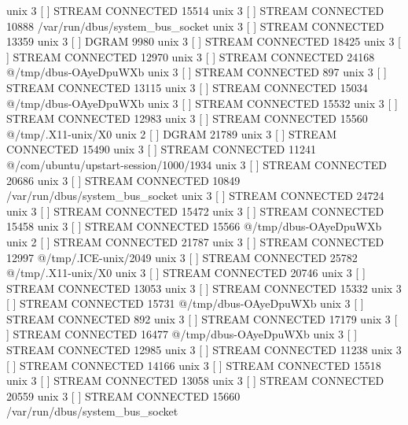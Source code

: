 unix  3      [ ]         STREAM     CONNECTED     15514    
unix  3      [ ]         STREAM     CONNECTED     10888    /var/run/dbus/system_bus_socket
unix  3      [ ]         STREAM     CONNECTED     13359    
unix  3      [ ]         DGRAM                    9980     
unix  3      [ ]         STREAM     CONNECTED     18425    
unix  3      [ ]         STREAM     CONNECTED     12970    
unix  3      [ ]         STREAM     CONNECTED     24168    @/tmp/dbus-OAyeDpuWXb
unix  3      [ ]         STREAM     CONNECTED     897      
unix  3      [ ]         STREAM     CONNECTED     13115    
unix  3      [ ]         STREAM     CONNECTED     15034    @/tmp/dbus-OAyeDpuWXb
unix  3      [ ]         STREAM     CONNECTED     15532    
unix  3      [ ]         STREAM     CONNECTED     12983    
unix  3      [ ]         STREAM     CONNECTED     15560    @/tmp/.X11-unix/X0
unix  2      [ ]         DGRAM                    21789    
unix  3      [ ]         STREAM     CONNECTED     15490    
unix  3      [ ]         STREAM     CONNECTED     11241    @/com/ubuntu/upstart-session/1000/1934
unix  3      [ ]         STREAM     CONNECTED     20686    
unix  3      [ ]         STREAM     CONNECTED     10849    /var/run/dbus/system_bus_socket
unix  3      [ ]         STREAM     CONNECTED     24724    
unix  3      [ ]         STREAM     CONNECTED     15472    
unix  3      [ ]         STREAM     CONNECTED     15458    
unix  3      [ ]         STREAM     CONNECTED     15566    @/tmp/dbus-OAyeDpuWXb
unix  2      [ ]         STREAM     CONNECTED     21787    
unix  3      [ ]         STREAM     CONNECTED     12997    @/tmp/.ICE-unix/2049
unix  3      [ ]         STREAM     CONNECTED     25782    @/tmp/.X11-unix/X0
unix  3      [ ]         STREAM     CONNECTED     20746    
unix  3      [ ]         STREAM     CONNECTED     13053    
unix  3      [ ]         STREAM     CONNECTED     15332    
unix  3      [ ]         STREAM     CONNECTED     15731    @/tmp/dbus-OAyeDpuWXb
unix  3      [ ]         STREAM     CONNECTED     892      
unix  3      [ ]         STREAM     CONNECTED     17179    
unix  3      [ ]         STREAM     CONNECTED     16477    @/tmp/dbus-OAyeDpuWXb
unix  3      [ ]         STREAM     CONNECTED     12985    
unix  3      [ ]         STREAM     CONNECTED     11238    
unix  3      [ ]         STREAM     CONNECTED     14166    
unix  3      [ ]         STREAM     CONNECTED     15518    
unix  3      [ ]         STREAM     CONNECTED     13058    
unix  3      [ ]         STREAM     CONNECTED     20559    
unix  3      [ ]         STREAM     CONNECTED     15660    /var/run/dbus/system_bus_socket
